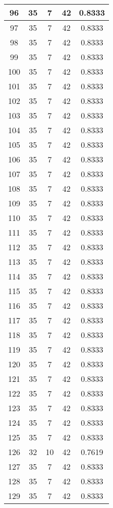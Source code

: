 \documentclass[letterpaper, 12pt]{article}
\begin{document}
\begin{longtable}{|c|c|c|c|c|}
\hline
96 & 35 & 7 & 42 & 0.8333 \\
\hline
97 & 35 & 7 & 42 & 0.8333 \\
\hline
98 & 35 & 7 & 42 & 0.8333 \\
\hline
99 & 35 & 7 & 42 & 0.8333 \\
\hline
100 & 35 & 7 & 42 & 0.8333 \\
\hline
101 & 35 & 7 & 42 & 0.8333 \\
\hline
102 & 35 & 7 & 42 & 0.8333 \\
\hline
103 & 35 & 7 & 42 & 0.8333 \\
\hline
104 & 35 & 7 & 42 & 0.8333 \\
\hline
105 & 35 & 7 & 42 & 0.8333 \\
\hline
106 & 35 & 7 & 42 & 0.8333 \\
\hline
107 & 35 & 7 & 42 & 0.8333 \\
\hline
108 & 35 & 7 & 42 & 0.8333 \\
\hline
109 & 35 & 7 & 42 & 0.8333 \\
\hline
110 & 35 & 7 & 42 & 0.8333 \\
\hline
111 & 35 & 7 & 42 & 0.8333 \\
\hline
112 & 35 & 7 & 42 & 0.8333 \\
\hline
113 & 35 & 7 & 42 & 0.8333 \\
\hline
114 & 35 & 7 & 42 & 0.8333 \\
\hline
115 & 35 & 7 & 42 & 0.8333 \\
\hline
116 & 35 & 7 & 42 & 0.8333 \\
\hline
117 & 35 & 7 & 42 & 0.8333 \\
\hline
118 & 35 & 7 & 42 & 0.8333 \\
\hline
119 & 35 & 7 & 42 & 0.8333 \\
\hline
120 & 35 & 7 & 42 & 0.8333 \\
\hline
121 & 35 & 7 & 42 & 0.8333 \\
\hline
122 & 35 & 7 & 42 & 0.8333 \\
\hline
123 & 35 & 7 & 42 & 0.8333 \\
\hline
124 & 35 & 7 & 42 & 0.8333 \\
\hline
125 & 35 & 7 & 42 & 0.8333 \\
\hline
126 & 32 & 10 & 42 & 0.7619 \\
\hline
127 & 35 & 7 & 42 & 0.8333 \\
\hline
128 & 35 & 7 & 42 & 0.8333 \\
\hline
129 & 35 & 7 & 42 & 0.8333 \\

\end{longtable}
\end{document}
